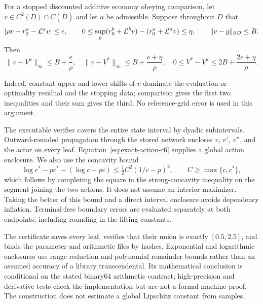 \begin{proposition}\label{prop:stopped-r6}
For a stopped discounted additive economy obeying comparison, let $v\in C^2(D)\cap C(\overline D)$ and let $a$ be admissible. Suppose throughout $D$ that
\[
 |\rho v-r_0^a-\mathcal L^av|\leq e,\qquad
 0\leq\sup_b(r_0^b+\mathcal L^bv)-(r_0^a+\mathcal L^av)\leq\eta,
 \qquad\|v-g\|_{\partial D}\leq B.
\]
Then
\begin{equation}\label{eq:stopped-bounds-r6}
 \|v-V^a\|_\infty\leq B+\frac e\rho,\quad
 \|v-V^*\|_\infty\leq B+\frac{e+\eta}\rho,\quad
 0\leq V^*-V^a\leq2B+\frac{2e+\eta}\rho.
\end{equation}
\end{proposition}
Indeed, constant upper and lower shifts of $v$ dominate the evaluation or optimality residual and the stopping data; comparison gives the first two inequalities and their sum gives the third. No reference-grid error is used in this argument.

The executable verifier covers the entire state interval by dyadic subintervals. Outward-rounded propagation through the stored network encloses $v$, $v'$, $v''$, and the actor on every leaf. Equation~\eqref{eq:exact-action-r6} supplies a global action enclosure. We also use the concavity bound
\begin{equation}\label{eq:concavity-gap-r6}
 \log c^*-pc^*-(\log c-pc)
 \leq \tfrac12 C^2(1/c-p)^2,\qquad C\geq\max\{c,c^*\},
\end{equation}
which follows by completing the square in the strong-concavity inequality on the segment joining the two actions. It does not assume an interior maximizer. Taking the better of this bound and a direct interval enclosure avoids dependency inflation. Terminal-free boundary errors are evaluated separately at both endpoints, including rounding in the lifting constants.

The certificate saves every leaf, verifies that their union is exactly $[0.5,2.5]$, and binds the parameter and arithmetic files by hashes. Exponential and logarithmic enclosures use range reduction and polynomial remainder bounds rather than an assumed accuracy of a library transcendental. Its mathematical conclusion is conditional on the stated binary64 arithmetic contract; high-precision and derivative tests check the implementation but are not a formal machine proof. The construction does not estimate a global Lipschitz constant from samples.

